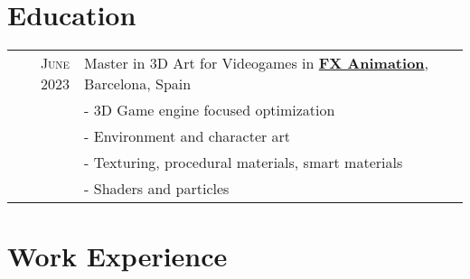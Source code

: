 \documentclass[a4paper,10pt]{article} %
\begin{document}
\pagestyle{empty} %


\par{\par} %
\vspace{10pt}
\par{\par} %
\par{\bigskip\par} %


\section{Education}

\begin{tabular}{rl}	
\textsc{June} 2023 & Master in 3D Art for Videogames in \href{https://www.fxbarcelonafilmschool.com/}{\textbf{FX Animation}}, Barcelona, Spain\\
& \footnotesize{- 3D Game engine focused optimization}\\
& \footnotesize{- Environment and character art}\\
& \footnotesize{- Texturing, procedural materials, smart materials}\\
& \footnotesize{- Shaders and particles}\\
\end{tabular}


\section{Work Experience}
\end{document}
